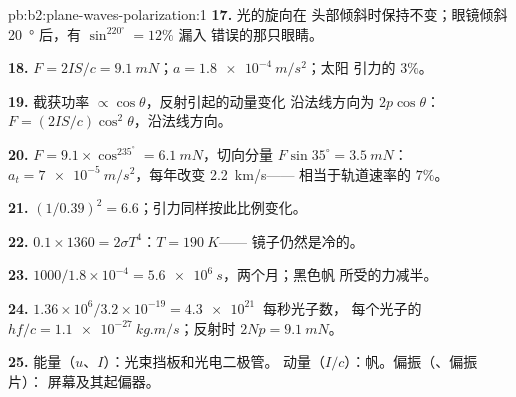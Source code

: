 \begin{solution}{pb:b2:plane-waves-polarization:1}
\textbf{17.} 光的旋向在
头部倾斜时保持不变；眼镜倾斜 \qty{20}{\degree} 后，有 $\sin^220^\circ = 12\%$ 漏入
错误的那只眼睛。

\textbf{18.} $F = 2IS/c = \qty{9.1}{mN}$；$a = \qty{1.8e-4}{m/s^2}$；太阳
引力的 $3\%$。

\textbf{19.} 截获功率 $\propto\cos\theta$，反射引起的动量变化
沿法线方向为 $2p\cos\theta$：$F = (2IS/c)\cos^2\theta$，沿法线方向。

\textbf{20.} $F = 9.1 \times \cos^235^\circ = \qty{6.1}{mN}$，切向分量 $F\sin35^\circ
= \qty{3.5}{mN}$：$a_t = \qty{7e-5}{m/s^2}$，每年改变 \qty{2.2}{km/s}——
相当于轨道速率的 $7\%$。

\textbf{21.} $(1/0.39)^2 = 6.6$；引力同样按此比例变化。

\textbf{22.} $0.1 \times 1360 = 2\sigma T^4$：$T = \qty{190}{K}$——
镜子仍然是冷的。

\textbf{23.} $1000/1.8 \times 10^{-4} = \qty{5.6e6}{s}$，两个月；黑色帆
所受的力减半。

\textbf{24.} $1.36 \times 10^6/3.2 \times 10^{-19} = \qty{4.3e21}{}$ 每秒光子数，
每个光子的 $hf/c = \qty{1.1e-27}{kg.m/s}$；反射时 $2Np = \qty{9.1}{mN}$。

\textbf{25.} 能量（$u$、$I$）：光束挡板和光电二极管。
动量（$I/c$）：帆。偏振（、偏振片）：
屏幕及其起偏器。
\end{solution}
